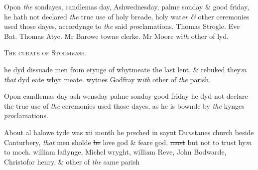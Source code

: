 \documentclass[12pt, a4paper]{book}
\begin{document}
 
 	
				\marginpar[\vspace{0.5cm}{\textcolor{Gray}{ceremonies}}]{}
			
 	
		\ifthenelse{\isodd{\thepage}}
		{\reversemarginpar}
		{\normalmarginpar}
		Opon \textit{the} sondayes, candlemas day, Ashwednesday,
 palme sonday \& good friday, he hath not declared
 \textit{the} true use of holy breade, holy wat\textit{er \&} other ceremonies used those dayes, accordynge to \textit{the} said \textit{pro}clamations. Thomas Strogle. Eve Bat. Thomas Atye.
 		Mr Barowe towne clerke. Mr Moore wi\textit{th} other of lyd.
 

            
               
				\begin{center} \begin{large} {\scshape The curate of Stodm\textit{er}sh.} \end{large} \end{center}
			

 
 	
				\marginpar[\vspace{0.5cm}{\textcolor{Gray}{lent}}]{}
			
 	
		\ifthenelse{\isodd{\thepage}}
		{\reversemarginpar}
		{\normalmarginpar}
		he dyd dissuade men from etynge of whytmeate the
 last lent, \& rebuked they\textit{m that} dyd eate whyt meate.
 wytnes Godfray w\textit{ith} other of \textit{the} parish.
 
            	
            		
				\marginpar[\vspace{0.5cm}{\textcolor{Gray}{ceremonies}}]{}
			
            		
		\ifthenelse{\isodd{\thepage}}
		{\reversemarginpar}
		{\normalmarginpar}
		Opon candlemas day ash wensday palme sonday good friday
			 he dyd not declare the true use
 of \textit{the} ceremonies used those dayes, as he is bownde
 by \textit{the} kynges \textit{pro}clamations.
            	
            		
				\marginpar[\vspace{0.5cm}{\textcolor{Gray}{n}}]{}
			
            		
		\ifthenelse{\isodd{\thepage}}
		{\reversemarginpar}
		{\normalmarginpar}
		About al halowe tyde was xii month he p\textit{re}ched in saynt
            			Du\textit{n}stanes church beside Canturbery, \textit{that} men sholde \sout{be}
 love god \& feare god, \sout{must} but not to trust hy\textit{m} to moch.
            			william laflynge, Michel wryght, willi\textit{a}m Reve, John
            				Bodwarde, Christofor henry, \& other of \textit{the} same
 parish
 
\end{document}
